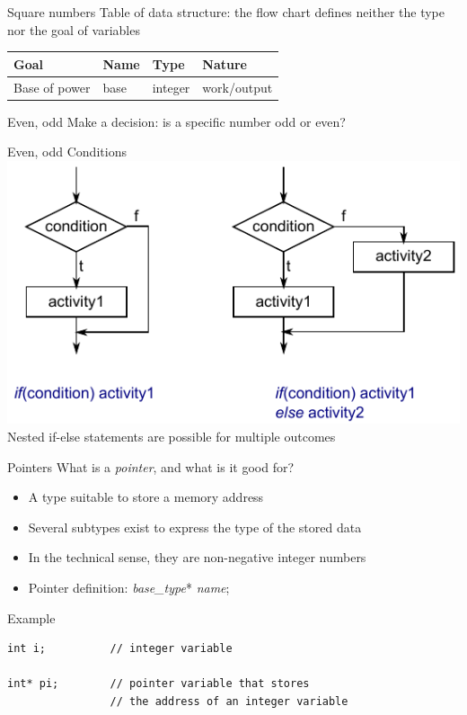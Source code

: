 \documentclass[usenames,dvipsnames,aspectratio=169]{beamer}
\begin{document}
\begin{frame}{Square numbers}
  Table of data structure: the flow chart defines neither the type nor the goal of variables
  \vfill
  \begin{center}
    \begin{tabular}{llll}
    Goal & Name & Type & Nature\\ \hline
    Base of power & base & integer & work/output \\
    \end{tabular}
  \end{center}
\end{frame}

\begin{frame}{Even, odd}
  Make a decision: is a specific number odd or even?
  \begin{exampleblock}{}
    \footnotesize
    
  \end{exampleblock}
\end{frame}

\begin{frame}{Even, odd}
  Conditions
  \vfill
  \includegraphics[width=.7\textwidth]{condition.pdf}
  \vfill
  Nested if-else statements are possible for multiple outcomes
\end{frame}

\begin{frame}[fragile]{Pointers}
  What is a \emph{pointer}, and what is it good for?
  \begin{itemize}
    \item A type suitable to store a memory address
    \item Several subtypes exist to express the type of the stored data
    \item In the technical sense, they are non-negative integer numbers
    \item Pointer definition: \emph{base\_type}* \emph{name};
  \end{itemize}
  \begin{exampleblock}{Example}
    \small
    \begin{verbatim}
int i;          // integer variable

int* pi;        // pointer variable that stores 
                // the address of an integer variable
\end{verbatim}
  \end{exampleblock}
\end{frame}
\end{document}
